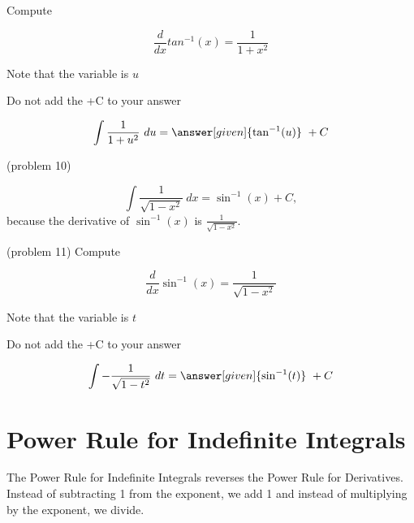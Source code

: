 \documentclass{ximera}
\begin{document}
\begin{problem} %
Compute 

\begin{hint}
\[
\frac{d}{dx} tan^{-1}(x) = \frac{1}{1+x^2}
\]
\end{hint}
\begin{hint}
Note that the variable is $u$
\end{hint}
\begin{hint}
\begin{center}
Do not add the +C to your answer
\end{center}
\end{hint}

\[
\int \frac{1}{1+u^2} \ du =
\answer[given]{\tan^{-1}(u)} \ + C
\]
\end{problem}(problem 10)


\begin{example}[example 11]
\[
\int \frac{1}{\sqrt{1 - x^2}} \ dx = \sin^{-1}(x) + C,
\]
because the derivative of $\sin^{-1}(x)$ 
is $\frac{1}{\sqrt{1 - x^2}}$.

\end{example}

\begin{problem}(problem 11)
Compute 

\begin{hint}
\[
\frac{d}{dx} \sin^{-1}(x) = \frac{1}{\sqrt{1 - x^2}}
\]
\end{hint}
\begin{hint}
Note that the variable is $t$
\end{hint}
\begin{hint}
\begin{center}
Do not add the +C to your answer
\end{center}
\end{hint}

\[
\int -\frac{1}{\sqrt{1 - t^2}} \ dt =
\answer[given]{\sin^{-1}(t)} \ + C
\]
\end{problem}

\section{Power Rule for Indefinite Integrals}

The Power Rule for Indefinite Integrals reverses the Power Rule for Derivatives.
Instead of subtracting 1 from the exponent, we add 1 and instead of multiplying by the exponent, we divide.
\end{document}
